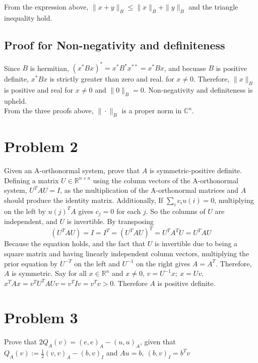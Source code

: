 \documentclass{article}
\begin{document}
\noindent From the expression above, $\|x+y\|_B \leq \|x\|_B + \|y\|_B$ and the triangle inequality hold.

\subsection*{Proof for Non-negativity and definiteness}

Since $B$ is hermitian, $(x^*Bx)^* = x^*B^*x^{**}= x^*Bx$, and becuase $B$ is positive definite, $x^*Bx$ is strictly greater than zero and real.
for $x\neq 0$. Therefore, $\|x\|_B$ is positive and real for $x \neq 0$ and $\|0\|_B=0$. Non-negativity and definiteness is upheld.\\

\noindent From the three proofs above, $\| \cdot \|_B$ is a proper norm in $\mathbb{C}^n$.

\section*{Problem 2}

Given an A-orthonormal system, prove that $A$ is symmetric-positive definite.\\ 

\noindent Defining a matrix $U\in\mathbb{R}^{n\times n}$ using the column vectors of the A-orthonormal system, $U^TAU=I$, 
as the multiplication of the A-orthonormal matrices and $A$ should produce the identity matrix. Additionally, If $\sum_i c_iu(i) = 0$, multiplying on the left by $u(j)^TA$ gives $c_j = 0$ for each $j$.
So the columns of $U$ are independent, and $U$ is invertible. By transposing $$(U^TAU)=I=I^T=(U^TAU)^T=U^TA^TU=U^TAU$$ 
Because the equation holds, and the fact that $U$ is invertible due to being a square matrix and having linearly independent column vectors, 
multiplying the prior equation by $U^{-T}$ on the left and $U^{-1}$ on the right gives $A=A^T$. Therefore, $A$ is symmetric. 
Say for all $x\in \mathbb{R}^n$ and $x \neq 0$, $v=U^{-1}x; \ x = Uv$. $x^TAx=v^TU^TAUv=v^TIv=v^Tv>0$. Therefore $A$ is positive definite.


\section*{Problem 3}

Prove that $2Q_A(v) = (e,e)_A - (u,u)_A$, given that $Q_A(v) := \frac{1}{2}(v,v)_A - (b,v)_I$ and $Au=b, \ (b,v)_I=b^Tv$\\
\end{document}
